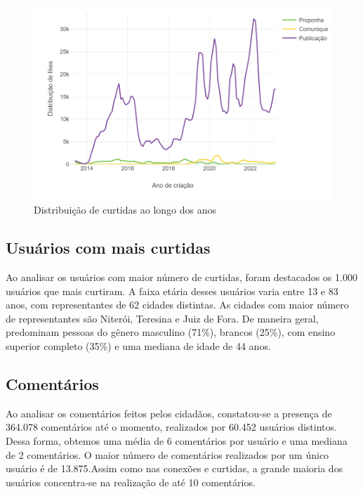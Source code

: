 \begin{figure}[!htb]
	\caption{Distribuição de curtidas ao longo dos anos}
	\label{fig:colab_likes_overtime}
	\centering
	\includegraphics[scale=0.7]{images/colab_likes_overtime.png}
\end{figure}

\subsection*{Usuários com mais curtidas}

Ao analisar os usuários com maior número de curtidas, foram destacados os 1.000 usuários que mais curtiram. A faixa etária desses usuários varia entre 13 e 83 anos, com representantes de 62 cidades distintas. As cidades com maior número de representantes são Niterói, Teresina e Juiz de Fora. De maneira geral, predominam pessoas do gênero masculino (71\%), brancos (25\%), com ensino superior completo (35\%) e uma mediana de idade de 44 anos.

\subsection*{Comentários}

Ao analisar os comentários feitos pelos cidadãos, constatou-se a presença de 364.078 comentários até o momento, realizados por 60.452 usuários distintos. Dessa forma, obtemos uma média de 6 comentários por usuário e uma mediana de 2 comentários. O maior número de comentários realizados por um único usuário é de 13.875.Assim como nas conexões e curtidas, a grande maioria dos usuários concentra-se na realização de até 10 comentários.

